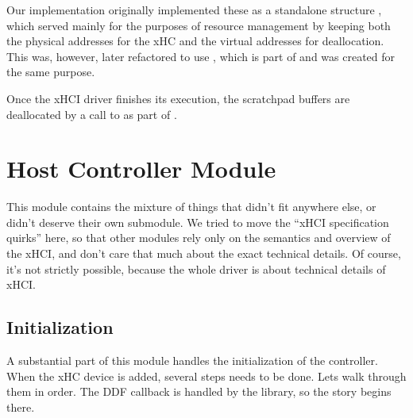 Our implementation originally implemented these as a standalone structure ,
which served mainly for the purposes of resource management by keeping both the physical addresses
for the xHC and the virtual addresses for deallocation. This was, however, later refactored to use
, which is part of  and was created for the same purpose.

Once the xHCI driver finishes its execution, the scratchpad buffers are deallocated by a call to
 as part of .




\section{Host Controller Module}

This module contains the mixture of things that didn't fit anywhere else, or
didn't deserve their own submodule. We tried to move the ``xHCI specification
quirks'' here, so that other modules rely only on the semantics and overview of
the xHCI, and don't care that much about the exact technical details. Of
course, it's not strictly possible, because the whole driver is about technical
details of xHCI.

\subsection{Initialization}

A substantial part of this module handles the initialization of the controller.
When the xHC device is added, several steps needs to be done. Lets walk through
them in order. The DDF callback  is handled by the
 library, so the story begins there.

